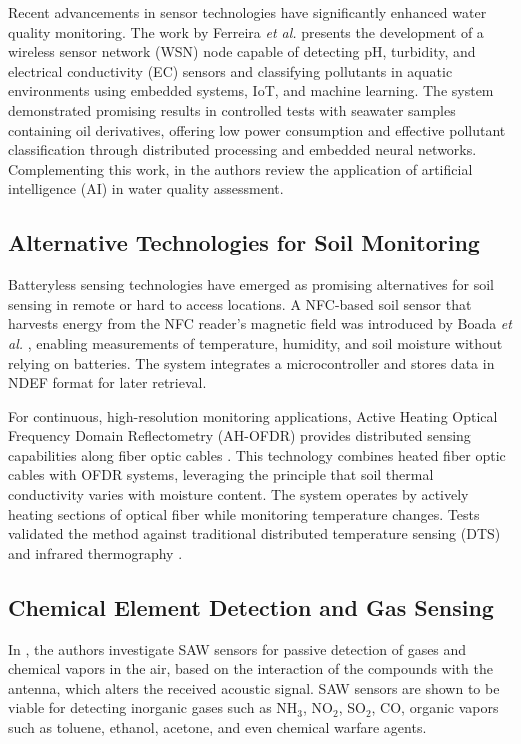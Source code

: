 \documentclass[conference]{IEEEtran}
\begin{document}
Recent advancements in sensor technologies have significantly enhanced water quality monitoring. The work by Ferreira \textit{et al.} \cite{ferreira_2023_conception} presents the development of a wireless sensor network (WSN) node capable of detecting pH, turbidity, and electrical conductivity (EC) sensors and classifying pollutants in aquatic environments using embedded systems, IoT, and machine learning. The system demonstrated promising results in controlled tests with seawater samples containing oil derivatives, offering low power consumption and effective pollutant classification through distributed processing and embedded neural networks. Complementing this work, in \cite{nr_2025_ai} the authors review the application of artificial intelligence (AI) in water quality assessment.

\subsection{Alternative Technologies for Soil Monitoring}

Batteryless sensing technologies have emerged as promising alternatives for soil sensing in remote or hard to access locations. A NFC-based soil sensor that harvests energy from the NFC reader’s magnetic field was introduced by Boada \textit{et al.} \cite{boada_2018_batteryless}, enabling measurements of temperature, humidity, and soil moisture without relying on batteries. The system integrates a microcontroller and stores data in NDEF format for later retrieval.

For continuous, high-resolution monitoring applications, Active Heating Optical Frequency Domain Reflectometry (AH-OFDR) provides distributed sensing capabilities along fiber optic cables \cite{sun_2024_highresolution}. This technology combines heated fiber optic cables with OFDR systems, leveraging the principle that soil thermal conductivity varies with moisture content. The system operates by actively heating sections of optical fiber while monitoring temperature changes. Tests validated the method against traditional distributed temperature sensing (DTS) and infrared thermography \cite{sun_2024_highresolution}.

\subsection{Chemical Element Detection and Gas Sensing}

In \cite{devkota_2017_saw}, the authors investigate SAW sensors for passive detection of gases and chemical vapors in the air, based on the interaction of the compounds with the antenna, which alters the received acoustic signal. SAW sensors are shown to be viable for detecting inorganic gases such as NH$_3$, NO$_2$, SO$_2$, CO, organic vapors such as toluene, ethanol, acetone, and even chemical warfare agents.
\end{document}
